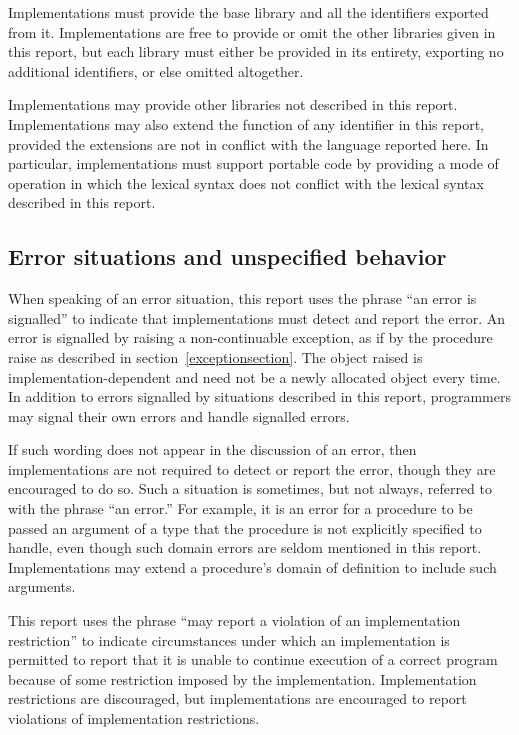 Implementations must provide the base library and all the identifiers
exported from it.  Implementations are free to provide or omit the other
libraries given in this report, but each library must either be provided
in its entirety, exporting no additional identifiers, or else omitted
altogether.

Implementations may provide other libraries not described in this report.
Implementations may also extend the function of any identifier in this
report, provided the extensions are not in conflict with the language
reported here.  In particular, implementations must support portable
code by providing a mode of operation in which the lexical syntax does
not conflict with the lexical syntax described in this report.

\subsection{Error situations and unspecified behavior}
\label{errorsituations}

When speaking of an error situation, this report uses the phrase ``an
error is signalled'' to indicate that implementations must detect and
report the error.
An error is signalled by raising a non-continuable exception, as if by
the procedure {\cf raise} as described in section~\ref{exceptionsection}.  The object raised is implementation-dependent
and need not be a newly allocated object every time.
In addition to errors signalled by situations described in this
report, programmers may signal their own errors and handle signalled errors.


\vest If such wording does not appear in the discussion of
an error, then implementations are not required to detect or report the
error, though they are encouraged to do so.
Such a situation is sometimes, but not always, referred to with the phrase
``an error.''
For example, it is an error for a procedure to be passed an argument of a type that
the procedure is not explicitly specified to handle, even though such
domain errors are seldom mentioned in this report.  Implementations may
extend a procedure's domain of definition to include such arguments.

\vest This report uses the phrase ``may report a violation of an
implementation restriction'' to indicate circumstances under which an
implementation is permitted to report that it is unable to continue
execution of a correct program because of some restriction imposed by the
implementation.  Implementation restrictions are discouraged,
but implementations are encouraged to report violations of implementation
restrictions.

